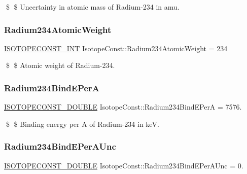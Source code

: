 \$ \$ Uncertainty in atomic mass of Radium-\/234 in amu. \mbox{\label{group___isotope_const-_radium-_ra234_ga4780d67e8e77923087e5d189282f9f2d}} 
\subsubsection{\texorpdfstring{Radium234\+Atomic\+Weight}{Radium234AtomicWeight}}
{\footnotesize\ttfamily \mbox{\hyperlink{group___isotope_const-_macros_ga5f18360b3e99483a35c32d789e62621c}{I\+S\+O\+T\+O\+P\+E\+C\+O\+N\+S\+T\+\_\+\+I\+NT}} Isotope\+Const\+::\+Radium234\+Atomic\+Weight = 234}

\$ \$ Atomic weight of Radium-\/234. \mbox{\label{group___isotope_const-_radium-_ra234_gaf5253a24c0698bc3004f76930d8a4239}} 
\subsubsection{\texorpdfstring{Radium234\+Bind\+E\+PerA}{Radium234BindEPerA}}
{\footnotesize\ttfamily \mbox{\hyperlink{group___isotope_const-_macros_ga8f45a7272ce02c0b4c65c44636ed719a}{I\+S\+O\+T\+O\+P\+E\+C\+O\+N\+S\+T\+\_\+\+D\+O\+U\+B\+LE}} Isotope\+Const\+::\+Radium234\+Bind\+E\+PerA = 7576.}

\$ \$ Binding energy per A of Radium-\/234 in keV. \mbox{\label{group___isotope_const-_radium-_ra234_ga75ca4fa3738d53e87e175c7cdce836c5}} 
\subsubsection{\texorpdfstring{Radium234\+Bind\+E\+Per\+A\+Unc}{Radium234BindEPerAUnc}}
{\footnotesize\ttfamily \mbox{\hyperlink{group___isotope_const-_macros_ga8f45a7272ce02c0b4c65c44636ed719a}{I\+S\+O\+T\+O\+P\+E\+C\+O\+N\+S\+T\+\_\+\+D\+O\+U\+B\+LE}} Isotope\+Const\+::\+Radium234\+Bind\+E\+Per\+A\+Unc = 0.}


